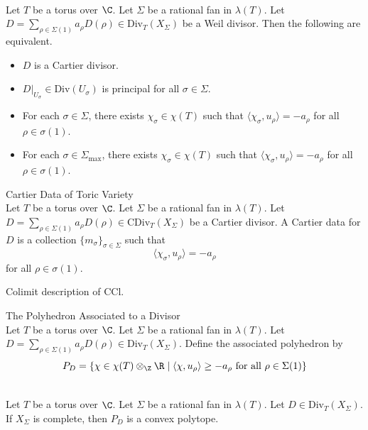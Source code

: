 \documentclass[a4paper]{article}
\begin{document}
\begin{prp}{}{}\\
Let $T$ be a torus over $\C$. Let $\Sigma$ be a rational fan in $\lambda(T)$. Let $D=\sum_{\rho\in\Sigma(1)}a_\rho D(\rho)\in\text{Div}_T(X_\Sigma)$ be a Weil divisor. Then the following are equivalent. 
\begin{itemize}
\item $D$ is a Cartier divisor. 
\item $D|_{U_\sigma}\in\text{Div}(U_\sigma)$ is principal for all $\sigma\in\Sigma$. 
\item For each $\sigma\in\Sigma$, there exists $\chi_\sigma\in\chi(T)$ such that $\langle\chi_\sigma,u_\rho\rangle=-a_\rho$ for all $\rho\in\sigma(1)$. 
\item For each $\sigma\in\Sigma_\text{max}$, there exists $\chi_\sigma\in\chi(T)$ such that $\langle\chi_\sigma,u_\rho\rangle=-a_\rho$ for all $\rho\in\sigma(1)$. 
\end{itemize}
\end{prp}

\begin{defn}{Cartier Data of Toric Variety}{}\\
Let $T$ be a torus over $\C$. Let $\Sigma$ be a rational fan in $\lambda(T)$. Let $D=\sum_{\rho\in\Sigma(1)}a_\rho D(\rho)\in\text{CDiv}_T(X_\Sigma)$ be a Cartier divisor. A Cartier data for $D$ is a collection $\{m_\sigma\}_{\sigma\in\Sigma}$ such that $$\langle\chi_\sigma,u_\rho\rangle=-a_\rho$$ for all $\rho\in\sigma(1)$. 
\end{defn}

Colimit description of $\text{CCl}$. 

\begin{defn}{The Polyhedron Associated to a Divisor}{}\\
Let $T$ be a torus over $\C$. Let $\Sigma$ be a rational fan in $\lambda(T)$. Let $D=\sum_{\rho\in\Sigma(1)}a_\rho D(\rho)\in\text{Div}_T(X_\Sigma)$. Define the associated polyhedron by $$P_D=\{\chi\in\chi(T)\otimes_\Z\R\;|\;\langle\chi,u_\rho\rangle\geq-a_\rho\text{ for all }\rho\in\Sigma(1)\}$$
\end{defn}

\begin{lmm}{}{}\\
Let $T$ be a torus over $\C$. Let $\Sigma$ be a rational fan in $\lambda(T)$. Let $D\in\text{Div}_T(X_\Sigma)$. If $X_\Sigma$ is complete, then $P_D$ is a convex polytope. 
\end{lmm}
\end{document}
